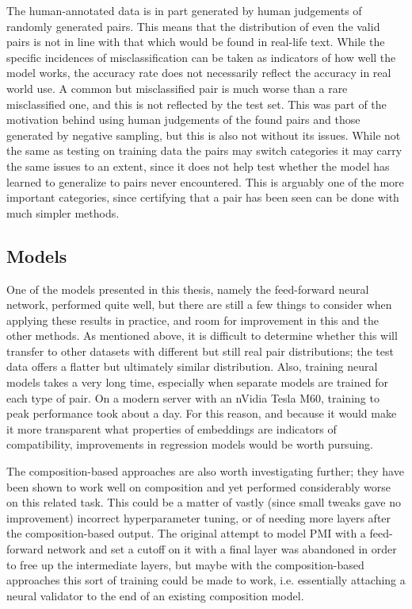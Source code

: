 \documentclass[a4paper, 11pt]{scrartcl}
\begin{document}
The human-annotated data is in part generated by human judgements of randomly generated pairs. This means that the distribution of even the valid pairs is not in line with that which would be found in real-life text. While the specific incidences of misclassification can be taken as indicators of how well the model works, the accuracy rate does not necessarily reflect the accuracy in real world use. A common but misclassified pair is much worse than a rare misclassified one, and this is not reflected by the test set. This was part of the motivation behind using human judgements of the found pairs and those generated by negative sampling, but this is also not without its issues. While not the same as testing on training data \textemdash the pairs may switch categories \textemdash it may carry the same issues to an extent, since it does not help test whether the model has learned to generalize to pairs never encountered. This is arguably one of the more important categories, since certifying that a pair has been seen can be done with much simpler methods.

\subsection{Models}
One of the models presented in this thesis, namely the feed-forward neural network, performed quite well, but there are still a few things to consider when applying these results in practice, and room for improvement in this and the other methods. As mentioned above, it is difficult to determine whether this will transfer to other datasets with different but still real pair distributions; the test data offers a flatter but ultimately similar distribution. Also, training neural models takes a very long time, especially when separate models are trained for each type of pair. On a modern server with an nVidia Tesla M60, training to peak performance took about a day. For this reason, and because it would make it more transparent what properties of embeddings are indicators of compatibility, improvements in regression models would be worth pursuing.

The composition-based approaches are also worth investigating further; they have been shown to work well on composition and yet performed considerably worse on this related task. This could be a matter of vastly (since small tweaks gave no improvement) incorrect hyperparameter tuning, or of needing more layers after the composition-based output. The original attempt to model PMI with a feed-forward network and set a cutoff on it with a final layer was abandoned in order to free up the intermediate layers, but maybe with the composition-based approaches this sort of training could be made to work, i.e. essentially attaching a neural validator to the end of an existing composition model.
\end{document}
